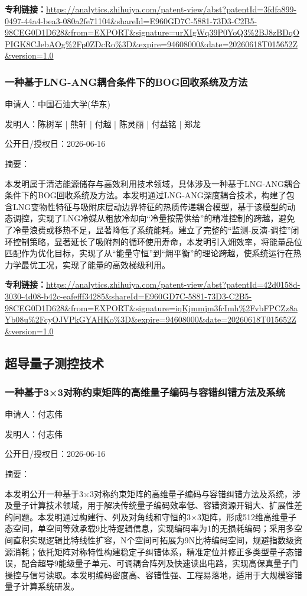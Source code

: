 \documentclass[12pt,a4paper]{ctexart}
\begin{document}
\noindent\textbf{专利链接：}\url{https://analytics.zhihuiya.com/patent-view/abst?patentId=3fdfa899-0497-44a4-bea3-080a2fe71104&shareId=E960GD7C-5881-73D3-C2B5-98CEG0D1D628&from=EXPORT&signature=urXIgWq39P0YoQ3%2BJ8zBDqOPIGK8CJebAOg%2Fp0ZDcRo%3D&expire=94608000&date=20260618T015652Z&version=1.0}

\subsubsection{ 一种基于LNG-ANG耦合条件下的BOG回收系统及方法 }

申请人：中国石油大学(华东)

发明人：陈树军 | 熊轩 | 付越 | 陈灵丽 | 付益铭 | 郑龙

公开日/授权日：2026-06-16

摘要：

本发明属于清洁能源储存与高效利用技术领域，具体涉及一种基于LNG‑ANG耦合条件下的BOG回收系统及方法。本发明通过LNG‑ANG深度耦合技术，构建了包含LNG变物性特征与吸附床层动边界特征的热质传递耦合模型，基于该模型的动态调控，实现了LNG冷媒从粗放冷却向“冷量按需供给”的精准控制的跨越，避免了冷量浪费或移热不足，显著降低了系统能耗。建立了完整的“监测‑反演‑调控”闭环控制策略，显著延长了吸附剂的循环使用寿命，本发明引入㶲效率，将能量品位匹配作为优化目标，实现了从“能量守恒”到“㶲平衡”的理论跨越，使系统运行在热力学最优工况，实现了能量的高效梯级利用。

\noindent\textbf{专利链接：}\url{https://analytics.zhihuiya.com/patent-view/abst?patentId=42d0158d-3030-4d08-b42c-eafefff34285&shareId=E960GD7C-5881-73D3-C2B5-98CEG0D1D628&from=EXPORT&signature=iqKjmmjm3fcImh%2FvbFPCZz8aYb08u%2FcyOJVPkGYAHKo%3D&expire=94608000&date=20260618T015652Z&version=1.0}


\subsection{ 超导量子测控技术 }

\subsubsection{ 一种基于3×3对称约束矩阵的高维量子编码与容错纠错方法及系统 }

申请人：付志伟

发明人：付志伟

公开日/授权日：2026-06-16

摘要：

本发明公开一种基于3×3对称约束矩阵的高维量子编码与容错纠错方法及系统，涉及量子计算技术领域，用于解决传统量子编码效率低、容错资源开销大、扩展性差的问题。本发明通过构建行、列及对角线和守恒的3×3矩阵，形成512维高维量子态空间，单空间等效承载9比特逻辑信息，实现编码率为1的无损耗编码；采用多空间直积实现逻辑比特线性扩容，N个空间可拓展为9N比特编码空间，规避指数级资源消耗；依托矩阵对称特性构建稳定子纠错体系，精准定位并修正多类型量子态错误，配合超导9能级量子单元、可调耦合阵列及快速读出电路，实现高保真量子门操控与信号读取。本发明编码密度高、容错性强、工程易落地，适用于大规模容错量子计算系统研发。
\end{document}
